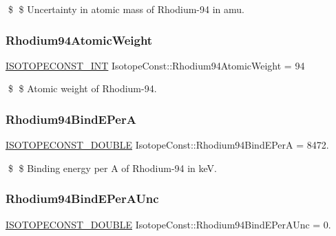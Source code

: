 \$ \$ Uncertainty in atomic mass of Rhodium-\/94 in amu. \mbox{\label{group___isotope_const-_rhodium-_rh94_gaade61dbeee44380b1512a51460698691}} 
\subsubsection{\texorpdfstring{Rhodium94\+Atomic\+Weight}{Rhodium94AtomicWeight}}
{\footnotesize\ttfamily \mbox{\hyperlink{group___isotope_const-_macros_ga5f18360b3e99483a35c32d789e62621c}{I\+S\+O\+T\+O\+P\+E\+C\+O\+N\+S\+T\+\_\+\+I\+NT}} Isotope\+Const\+::\+Rhodium94\+Atomic\+Weight = 94}

\$ \$ Atomic weight of Rhodium-\/94. \mbox{\label{group___isotope_const-_rhodium-_rh94_gadeb3d9c7df541582d7348d09e9f0f7c8}} 
\subsubsection{\texorpdfstring{Rhodium94\+Bind\+E\+PerA}{Rhodium94BindEPerA}}
{\footnotesize\ttfamily \mbox{\hyperlink{group___isotope_const-_macros_ga8f45a7272ce02c0b4c65c44636ed719a}{I\+S\+O\+T\+O\+P\+E\+C\+O\+N\+S\+T\+\_\+\+D\+O\+U\+B\+LE}} Isotope\+Const\+::\+Rhodium94\+Bind\+E\+PerA = 8472.}

\$ \$ Binding energy per A of Rhodium-\/94 in keV. \mbox{\label{group___isotope_const-_rhodium-_rh94_ga50738d65cb2957f07580bb11f7abd1bc}} 
\subsubsection{\texorpdfstring{Rhodium94\+Bind\+E\+Per\+A\+Unc}{Rhodium94BindEPerAUnc}}
{\footnotesize\ttfamily \mbox{\hyperlink{group___isotope_const-_macros_ga8f45a7272ce02c0b4c65c44636ed719a}{I\+S\+O\+T\+O\+P\+E\+C\+O\+N\+S\+T\+\_\+\+D\+O\+U\+B\+LE}} Isotope\+Const\+::\+Rhodium94\+Bind\+E\+Per\+A\+Unc = 0.}

